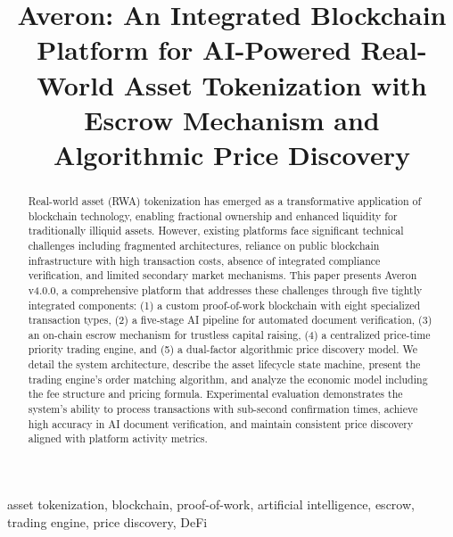 \documentclass[conference]{IEEEtran}
\begin{document}
\title{Averon: An Integrated Blockchain Platform for AI-Powered Real-World Asset Tokenization with Escrow Mechanism and Algorithmic Price Discovery}

\author{
\and
{}
}

\maketitle

\begin{abstract}
Real-world asset (RWA) tokenization has emerged as a transformative application of blockchain technology, enabling fractional ownership and enhanced liquidity for traditionally illiquid assets. However, existing platforms face significant technical challenges including fragmented architectures, reliance on public blockchain infrastructure with high transaction costs, absence of integrated compliance verification, and limited secondary market mechanisms. This paper presents Averon v4.0.0, a comprehensive platform that addresses these challenges through five tightly integrated components: (1) a custom proof-of-work blockchain with eight specialized transaction types, (2) a five-stage AI pipeline for automated document verification, (3) an on-chain escrow mechanism for trustless capital raising, (4) a centralized price-time priority trading engine, and (5) a dual-factor algorithmic price discovery model. We detail the system architecture, describe the asset lifecycle state machine, present the trading engine's order matching algorithm, and analyze the economic model including the fee structure and pricing formula. Experimental evaluation demonstrates the system's ability to process transactions with sub-second confirmation times, achieve high accuracy in AI document verification, and maintain consistent price discovery aligned with platform activity metrics.
\end{abstract}

\begin{IEEEkeywords}
asset tokenization, blockchain, proof-of-work, artificial intelligence, escrow, trading engine, price discovery, DeFi
\end{IEEEkeywords}
\end{document}
